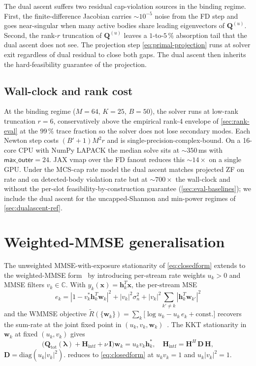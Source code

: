 \documentclass[journal,twocolumn,10pt]{IEEEtran}
\theoremstyle{plain}
\theoremstyle{remark}
\newcommand{\xx}{\mathbf{x}}
\newcommand{\hh}{\mathbf{h}}
\newcommand{\ww}{\mathbf{w}}
\newcommand{\Qmat}{\mathbf{Q}}
\newcommand{\Hintf}{\mathbf{H}_{\mathrm{intf}}}
\newcommand{\Complex}{\mathbb{C}}
\begin{document}
The dual ascent suffers two residual cap-violation sources in the
binding regime. First, the finite-difference Jacobian carries
$\sim 10^{-5}$ noise from the FD step and goes near-singular when
many active bodies share leading eigenvectors of $\Qmat^{(u)}$.
Second, the rank-$r$ truncation of $\Qmat^{(u)}$ leaves a
$1$-to-$5\,\%$ absorption tail that the dual ascent does not see.
The projection step \cref{eq:primal-projection} runs at solver
exit regardless of dual residual to close both gaps. The dual
ascent then inherits the hard-feasibility guarantee of the
projection.

\subsection*{Wall-clock and rank cost}

At the binding regime ($M = 64$, $K = 25$, $B = 50$), the solver
runs at low-rank truncation $r = 6$, conservatively above the
empirical rank-4 envelope of \cref{sec:rank-eval} at the $99\,\%$
trace fraction so the solver does not lose secondary modes. Each
Newton step costs $(B' + 1) M^2 r$ and is
single-precision-complex-bound. On a 16-core CPU with NumPy LAPACK
the median solve sits at $\sim 350\,$ms with
$\textsf{max\_outer} = 24$. JAX vmap over the FD fanout reduces
this $\sim 14\times$ on a single GPU. Under the MCS-cap rate model
the dual ascent matches projected ZF on rate and on detected-body
violation rate but at $\sim 700\times$ the wall-clock and without
the per-slot feasibility-by-construction guarantee
(\cref{sec:eval-baselines}); we include the dual ascent for the
uncapped-Shannon and min-power regimes of
\cref{sec:dualascent-ref}.


\section{Weighted-MMSE generalisation}\label{app:wmmse}

The unweighted MMSE-with-exposure stationarity of
\cref{eq:closedform} extends to the weighted-MMSE
form~\cite{Christensen2008,Shi2011} by introducing per-stream rate
weights $u_k > 0$ and MMSE filters $v_k \in \Complex$. With
$y_k(\xx) = \hh_k^T \xx$, the per-stream MSE
\begin{equation}\label{eq:wmmse-mse}
  e_k = |1 - v_k^* \hh_k^T \ww_k|^2 + |v_k|^2 \sigma_n^2 +
  |v_k|^2 \sum_{k' \neq k} |\hh_k^T \ww_{k'}|^2
\end{equation}
and the WMMSE objective
$\tilde R(\{\ww_k\}) = \sum_k\bigl[\log u_k - u_k\,e_k +
\mathrm{const.}\bigr]$ recovers the sum-rate at the joint
fixed point in $(u_k, v_k, \ww_k)$~\cite{Christensen2008}. The
KKT stationarity in $\ww_k$ at fixed $(u_k, v_k)$ gives
\begin{equation}\label{eq:KKT-wmmse}
  \bigl(\Qmat_{\mathrm{tot}}(\bm\lambda) + \Hintf + \nu\,
  \mathbf{I}\bigr) \ww_k = u_k v_k \hh_k^*,
  \quad
  \Hintf = \mathbf{H}^H\,\mathbf{D}\,\mathbf{H},
\end{equation}
$\mathbf{D} = \mathrm{diag}(u_k|v_k|^2)$. 
reduces to \cref{eq:closedform} at $u_k v_k = 1$ and $u_k|v_k|^2 = 1$.
\end{document}
